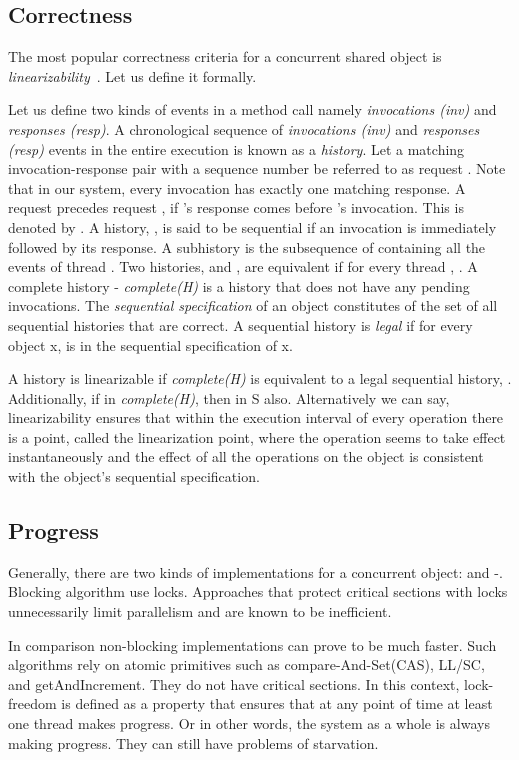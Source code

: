 \documentclass{llncs}
\begin{document}
\begin{appendix}
\subsection{Correctness}
\label{subsec:linearizability}
The most popular correctness criteria for a concurrent shared object is {\em
linearizability}~\cite{linearizability}. Let us define it formally.

Let us define two kinds of events in a
method call namely {\em invocations (inv)} and {\em responses (resp)}. A
chronological sequence of {\em invocations (inv)} and {\em responses (resp)}
events in the entire execution is known as a {\em history}.  Let a matching
invocation-response pair with a sequence number  be referred to as request
. Note that in our system, every invocation has exactly one matching
response.  A request  precedes request , if
's response comes before 's invocation.  This is denoted by  
. A history, , is said to be sequential if an invocation is immediately
followed by its response. A subhistory  is the subsequence of 
containing all the events of thread . Two histories,  and , are
equivalent if for every thread ,   . 
A complete history - {\em
complete(H)} is a history that does not have any pending invocations. 
The
{\em sequential specification} of an object constitutes of the set of all sequential
histories that are correct. A sequential history is {\em legal} if for every object
x,  is in the sequential specification of x. 


A history  is linearizable if {\em complete(H)} is equivalent to a legal
sequential history, . Additionally, if    in
{\em complete(H)}, then    in S also. Alternatively we can say,
linearizability ensures that within the execution interval of every operation
there is a point, called the linearization point, where the operation seems to
take effect instantaneously and the effect of all the operations on the object
is consistent with the object's sequential specification. 

\subsection{Progress}
\label{subsec:progress}

Generally, there are two kinds of implementations for a concurrent object:
 and -. Blocking algorithm use locks. Approaches
that protect critical sections with locks unnecessarily limit parallelism
and are known to be inefficient.


In comparison non-blocking implementations can prove to be much faster.
Such algorithms rely on atomic primitives such as 
compare-And-Set(CAS), LL/SC, and getAndIncrement. They do not have
critical sections.
In this context,  lock-freedom is defined as a property that ensures
that at any point of time at least one thread makes progress.
Or in other words, the system as a whole is always making progress. They
can still have problems of starvation.


\end{appendix}
\end{document}
